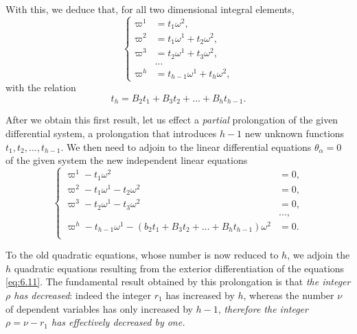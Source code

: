 \documentclass[leqno,11pt]{book}
\numberwithin{equation}{chapter}
\theoremstyle{shape1}
\theoremstyle{shape0}
\theoremstyle{shape2}
\theoremstyle{definition}
\begin{document}
With this, we deduce that, for all two dimensional integral elements,
\begin{equation}
  \label{eq:6.9}
  \left\{
    \begin{aligned}
      \varpi^{1}&=t_{1}\omega^{2},\\
      \varpi^{2}&=t_{1}\omega^{1}+t_{2}\omega^{2},\\
      \varpi^{3}&=t_{2}\omega^{1}+t_{3}\omega^{2},\\
      &\dots\\
      \varpi^{h}&=t_{h-1}\omega^{1}+t_{h}\omega^{2},
    \end{aligned}
  \right.
\end{equation}
with the relation
\begin{equation}
  \label{eq:6.10}
  t_{h}=B_{2}t_{1}+B_{3}t_{2}+\dots+B_{h}t_{h-1}.
\end{equation}


\vspace{12pt}\fsec After we obtain this first result, let us effect a \emph{partial} prolongation of the given differential system, a prolongation that introduces $h-1$ new unknown functions $t_{1},t_{2},\dots,t_{h-1}$. We then need to adjoin to the linear differential equations $\theta_{\alpha}=0$ of the given system the new independent linear equations
\begin{equation}
  \label{eq:6.11}
  \left\{
    \begin{aligned}
      \varpi^{1}-t_{1}\omega^{2}&=0,\\
      \varpi^{2}-t_{1}\omega^{1}-t_{2}\omega^{2}&=0,\\
      \varpi^{3}-t_{2}\omega^{1}-t_{3}\omega^{2}&=0,\\
      &\dots,\\
      \varpi^{h}-t_{h-1}\omega^{1}-(b_{2}t_{1}+B_{3}t_{2}+\dots+B_{h}t_{h-1})\omega^{2}&=0.\\
    \end{aligned}
  \right.
\end{equation}

To the old quadratic equations, whose number is now reduced to $h$, we adjoin the $h$ quadratic equations resulting from the exterior differentiation of the equations \eqref{eq:6.11}. The fundamental result obtained by this prolongation is that \emph{the integer $\rho$ has decreased}: indeed the integer $r_{1}$ has increased by $h$, whereas the number $\nu$ of dependent variables has only increased by $h-1$, \emph{therefore the integer $\rho=\nu-r_{1}$ has effectively decreased by one.}
\end{document}
